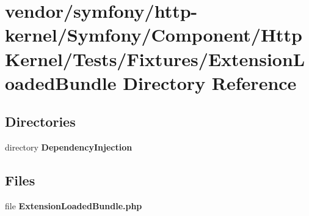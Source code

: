 \section{vendor/symfony/http-\/kernel/\+Symfony/\+Component/\+Http\+Kernel/\+Tests/\+Fixtures/\+Extension\+Loaded\+Bundle Directory Reference}
\label{dir_fb5cf04e2f120af40ca1c162259c843a}
\subsection*{Directories}
\begin{DoxyCompactItemize}
\item 
directory {\bf Dependency\+Injection}
\end{DoxyCompactItemize}
\subsection*{Files}
\begin{DoxyCompactItemize}
\item 
file {\bf Extension\+Loaded\+Bundle.\+php}
\end{DoxyCompactItemize}
